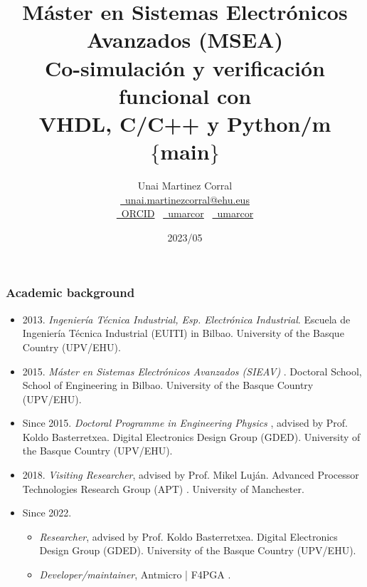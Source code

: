\documentclass{beamer}
\title{\small Máster en Sistemas Electrónicos Avanzados (MSEA)\\\Large Co-simulación y verificación funcional con\\VHDL, C/C++ y Python/m\\{\small $\{$main$\}$}}
\author{Unai Martinez Corral\\\href{mailto:unai.martinezcorral@ehu.eus}{\faEnvelope~unai.martinezcorral@ehu.eus}\\\href{https://orcid.org/0000-0003-1752-9181}{\faGlobe~ORCID} ~\href{https://github.com/umarcor}{\faGithub~umarcor} ~\href{https://gitlab.com/umarcor}{\faGitlab~umarcor}}
\institute{Escuela de Ingeniería de Bilbao\\Universidad del País Vasco/Euskal Herriko Unibertsitatea (UPV/EHU)}
\date{2023/05}
\begin{document}
\frame{\titlepage}

\begin{frame}
\frametitle{Academic background}
\small
\vfill
\begin{itemize}
\item
  2013.
  \emph{Ingeniería Técnica Industrial, Esp. Electrónica Industrial}.
  \tiny
  Escuela de Ingeniería Técnica Industrial (EUITI) in Bilbao.
  University of the Basque Country (UPV/EHU).
  \small

\vfill

\item
  2015.
  \emph{Máster en Sistemas Electrónicos Avanzados (SIEAV)} \href{https://www.ehu.eus/es/web/master/master-sistemas-electronicos-avanzados}{\faGlobe}.
  \tiny
  Doctoral School, School of Engineering in Bilbao.
  University of the Basque Country (UPV/EHU).
  \small

\vfill

\item
  Since 2015.
  \emph{Doctoral Programme in Engineering Physics} \href{https://www.ehu.eus/en/web/doktoregoak/doctorate-engineering-physics}{\faGlobe},
  advised by Prof. Koldo Basterretxea.
  \tiny
  Digital Electronics Design Group (GDED).
  University of the Basque Country (UPV/EHU).
  \small

\vfill

\item
  2018.
  \emph{Visiting Researcher},
  advised by Prof. Mikel Luján.
  \tiny
  Advanced Processor Technologies Research Group (APT) \href{http://apt.cs.manchester.ac.uk/}{\faGlobe}.
  University of Manchester.
  \small

\item
  Since 2022.
  \begin{itemize}
    \item \emph{Researcher},
  advised by Prof. Koldo Basterretxea.
  \tiny
  Digital Electronics Design Group (GDED).
  University of the Basque Country (UPV/EHU).
  \small

  \item \emph{Developer/maintainer},
  Antmicro \href{https://antmicro.com/}{\faGlobe} | F4PGA \href{https://f4pga.org/}{\faGlobe}.
  \end{itemize}
\end{itemize}
\vfill
\end{frame}
\end{document}
